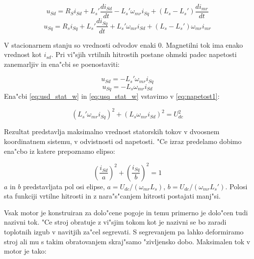 \documentclass[journal,a4paper,twoside]{sty/IEEEtran}
\begin{document}
\begin{equation}
u_{Sd}= R_S i_{Sd}+L_s' \frac{di_{Sd}}{dt}- L_s' \omega_{mr} i_{Sq}+(L_s-L_s')\frac{di_{mr}}{dt}
\label{eq:usd}
\end{equation}
\begin{equation}
u_{Sq}= R_s i_{Sq}+L_s' \frac{di_{Sq}}{dt} + L_s' \omega_{mr}i_{Sd}+(L_s-L_s')\omega_{mr}i_{mr}
\label{eq:usq}
\end{equation}



V stacionarnem stanju so vrednosti odvodov enaki 0. Magnetilni tok ima enako vrednost kot $i_{sd}$. Pri vi"sjih vrtilnih hitrostih postane ohmski padec napetosti zanemarljiv in ena"cbi se poenostaviti:

\begin{equation}
u_{Sd}= - L_s' \omega_{mr} i_{Sq}
\label{eq:usd_stat_w}
\end{equation}
\begin{equation}
u_{Sq}= - L_s \omega_{mr}i_{Sd}
\label{eq:usq_stat_w}
\end{equation}
 Ena"cbi \ref{eq:usd_stat_w} in \ref{eq:usq_stat_w} vstavimo v \ref{eq:napetost1}:

\begin{equation}
(L_s' \omega_{mr} i_{Sq})^2+(L_s \omega_{mr}i_{Sd})^2= U_{dc}^2
\label{eq:napetostnalim1}
\end{equation}

Rezultat predstavlja maksimalno vrednost statorskih tokov v dvoosnem koordinatnem sistemu, v odvistnosti od napetosti. "Ce izraz predelamo dobimo ena"cbo iz katere prepoznamo elipso: 

\begin{equation}
(\frac{i_{Sd}}{a})^2+(\frac{i_{Sq}}{b})^2 = 1
\label{eq:napetostnalim}
\end{equation}
$a$ in $b$ predstavljata pol osi elipse, $a=U_{dc}/(\omega_{mr}L_s)$, $b=U_{dc}/(\omega_{mr}L_s')$. Polosi sta funkciji vrtilne hitrosti in z nara"s"canjem hitrosti postajati manj"si.

Vsak motor je konstruiran za dolo"cene pogoje in temu primerno je dolo"cen tudi nazivni tok. "Ce stroj obratuje z vi"sjim tokom kot je nazivni se bo zaradi toplotnih izgub v navitjih za"cel segrevati. S segrevanjem pa lahko deformiramo stroj ali mu s takim obratovanjem skraj"samo "zivljensko dobo. Maksimalen tok v motor je tako:
\end{document}
